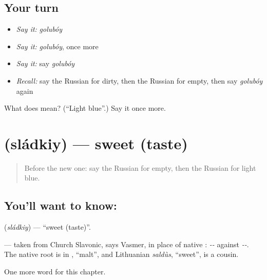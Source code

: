 \subsection*{Your turn}
\begin{itemize}
\raggedright
  \item \emph{Say it:} \emph{golubóy}
  \item \emph{Say it:} \emph{golubóy}, once more
  \item \emph{Say it:} say \emph{golubóy}
  \item \emph{Recall:} say the Russian for dirty, then the Russian for empty, then say \emph{golubóy} again
\end{itemize}

\begin{tcolorbox}[breakable,colback=teal!4,colframe=teal!35!black,title={Before you move on}]
What does  mean? (\textquotedblleft{}Light blue\textquotedblright{}.) Say it once more.
\end{tcolorbox}
\section[\texorpdfstring{\ru{сладкий} (sládkiy)}{сладкий (sládkiy)}]{ (sládkiy) — sweet (taste)}

\label{lesson:RU-C157-sladkiy}



\begin{quote}
Before the new one: say the Russian for empty, then the Russian for light blue.
\end{quote}

\subsection*{You'll want to know: }
\textbf{} (\emph{sládkiy}) — \textquotedblleft{}sweet (taste)\textquotedblright{}.

\begin{cousinweb}
\textbf{} — taken from Church Slavonic, says Vasmer, in place of native \emph{}: \emph{--} against \emph{--}. The native root is in \emph{}, \textquotedblleft{}malt\textquotedblright{}, and Lithuanian \emph{saldùs}, \textquotedblleft{}sweet\textquotedblright{}, is a cousin.
\end{cousinweb}

\begin{grammarlens}[title={What you've built}]
One more word for this chapter.
\end{grammarlens}

